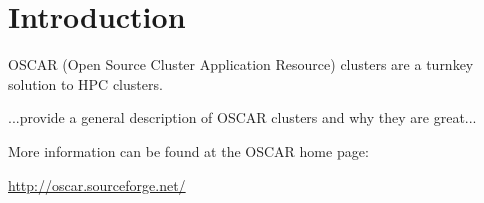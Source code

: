 %
%
%

\section{Introduction}

OSCAR (Open Source Cluster Application Resource) clusters are a
turnkey solution to HPC clusters.  

...provide a general description of OSCAR clusters and why they are
great...

More information can be found at the OSCAR home page:

\vspace{10pt}
\centerline{\url{http://oscar.sourceforge.net/}}
\vspace{10pt}

